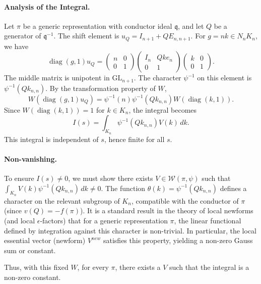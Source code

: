 \documentclass[12pt]{article}
\theoremstyle{plain}
\newcommand{\GL}{\mathrm{GL}}
\begin{document}
\paragraph{Analysis of the Integral.}
Let \(\pi\) be a generic representation with conductor ideal \(\mathfrak{q}\), and let \(Q\) be a generator of \(\mathfrak{q}^{-1}\). The shift element is \(u_Q = I_{n+1} + Q E_{n, n+1}\). For \(g = nk \in N_n K_n\), we have
\[
\operatorname{diag}(g, 1) u_Q = \begin{pmatrix} n & 0 \\ 0 & 1 \end{pmatrix} \begin{pmatrix} I_n & Q k e_n \\ 0 & 1 \end{pmatrix} \begin{pmatrix} k & 0 \\ 0 & 1 \end{pmatrix}.
\]
The middle matrix is unipotent in \(\GL_{n+1}\). The character \(\psi^{-1}\) on this element is \(\psi^{-1}(Q k_{n,n})\). By the transformation property of \(W\),
\[
W(\operatorname{diag}(g, 1) u_Q) = \psi^{-1}(n) \psi^{-1}(Q k_{n,n}) W(\operatorname{diag}(k, 1)).
\]
Since \(W(\operatorname{diag}(k, 1)) = 1\) for \(k \in K_n\), the integral becomes
\[
I(s) = \int_{K_n} \psi^{-1}(Q k_{n,n}) V(k) \, dk.
\]
This integral is independent of \(s\), hence finite for all \(s\).

\paragraph{Non-vanishing.}
To ensure \(I(s) \neq 0\), we must show there exists \(V \in \mathcal{W}(\pi, \psi)\) such that \(\int_{K_n} V(k) \psi^{-1}(Q k_{n,n}) \, dk \neq 0\).
The function \(\theta(k) = \psi^{-1}(Q k_{n,n})\) defines a character on the relevant subgroup of \(K_n\), compatible with the conductor of \(\pi\) (since \(v(Q) = -f(\pi)\)). It is a standard result in the theory of local newforms (and local \(\epsilon\)-factors) that for a generic representation \(\pi\), the linear functional defined by integration against this character is non-trivial. In particular, the local essential vector (newform) \(V^{new}\) satisfies this property, yielding a non-zero Gauss sum or constant.

Thus, with this fixed \(W\), for every \(\pi\), there exists a \(V\) such that the integral is a non-zero constant.
\end{document}
